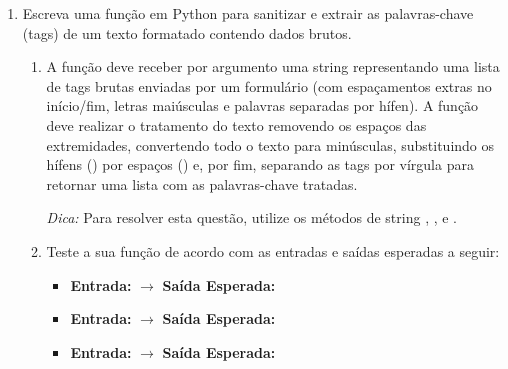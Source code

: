 \begin{enumerate}[label=\textbf{Q\arabic*.}]
    


    \item Escreva uma função em Python para sanitizar e extrair as palavras-chave (tags) de um texto formatado contendo dados brutos.
    \begin{enumerate}[label=\alph*)]
        \item A função deve receber por argumento uma string representando uma lista de tags brutas enviadas por um formulário (com espaçamentos extras no início/fim, letras maiúsculas e palavras separadas por hífen). A função deve realizar o tratamento do texto removendo os espaços das extremidades, convertendo todo o texto para minúsculas, substituindo os hífens (\code{-}) por espaços () e, por fim, separando as tags por vírgula para retornar uma lista com as palavras-chave tratadas.
        
        \textit{Dica:} Para resolver esta questão, utilize os métodos de string , ,  e .
        
        \item Teste a sua função de acordo com as entradas e saídas esperadas a seguir:
        \begin{itemize}
            \item \textbf{Entrada:}  $\rightarrow$ \textbf{Saída Esperada:} 
            \item \textbf{Entrada:}  $\rightarrow$ \textbf{Saída Esperada:} 
            \item \textbf{Entrada:}  $\rightarrow$ \textbf{Saída Esperada:} 
            \\
        \end{itemize}
    \end{enumerate}
    


\end{enumerate}